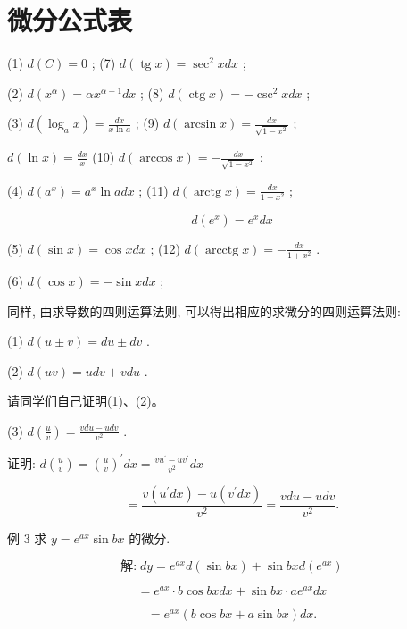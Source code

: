 \documentclass[lang=cn,newtx,10pt,scheme=chinese]{elegantbook}
\begin{document}
\section*{微分公式表}

(1) \(d\left( C\right) = 0\) ; (7) \(d\left( {\operatorname{tg}x}\right) = {\sec }^{2}{xdx}\) ;

(2) \(d\left( {x}^{\alpha }\right) = \alpha {x}^{\alpha - 1}{dx}\) ; (8) \(d\left( {\operatorname{ctg}x}\right) = - {\csc }^{2}{xdx}\) ;

(3) \(d\left( {{\log }_{a}x}\right) = \frac{dx}{x\ln a}\) ; (9) \(d\left( {\arcsin x}\right) = \frac{dx}{\sqrt{1 - {x}^{2}}}\) ;

\(d\left( {\ln x}\right) = \frac{dx}{x}\) (10) \(d\left( {\arccos x}\right) = - \frac{dx}{\sqrt{1 - {x}^{2}}}\) ;

(4) \(d\left( {a}^{x}\right) = {a}^{x}\ln {adx}\) ; (11) \(d\left( {\operatorname{arctg}x}\right) = \frac{dx}{1 + {x}^{2}}\) ;

\[
d\left( {e}^{x}\right) = {e}^{x}{dx}
\]

(5) \(d\left( {\sin x}\right) = \cos {xdx}\) ; (12) \(d\left( {\operatorname{arcctg}x}\right) = - \frac{dx}{1 + {x}^{2}}\) .

(6) \(d\left( {\cos x}\right) = - \sin {xdx}\) ;

同样, 由求导数的四则运算法则, 可以得出相应的求微分的四则运算法则:

(1) \(d\left( {u \pm v}\right) = {du} \pm {dv}\) .

(2) \(d\left( {uv}\right) = {udv} + {vdu}\) .

请同学们自己证明(1)、(2)。

(3) \(d\left( \frac{u}{v}\right) = \frac{{vdu} - {udv}}{{v}^{2}}\) .

证明: \(d\left( \frac{u}{v}\right) = {\left( \frac{u}{v}\right) }^{\prime }{dx} = \frac{v{u}^{\prime } - u{v}^{\prime }}{{v}^{2}}{dx}\)

\[
= \frac{v\left( {{u}^{\prime }{dx}}\right) - u\left( {{v}^{\prime }{dx}}\right) }{{v}^{2}} = \frac{{vdu} - {udv}}{{v}^{2}}.
\]

例 3 求 \(y = {e}^{ax}\sin {bx}\) 的微分.

\[
\text{解:}\;{dy} = {e}^{ax}d\left( {\sin {bx}}\right) + \sin {bxd}\left( {e}^{ax}\right)
\]

\[
= {e}^{ax} \cdot b\cos {bxdx} + \sin {bx} \cdot a{e}^{ax}{dx}
\]

\[
= {e}^{ax}\left( {b\cos {bx} + a\sin {bx}}\right) {dx}\text{.}
\]
\end{document}
